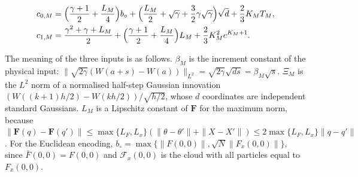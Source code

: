 \documentclass[11pt,a4paper]{report}
\begin{document}
\[\begin{aligned}c_{0,M}&=\Bigl(\frac{\gamma+1}{2}+\frac{L_M}{4}\Bigr)b_\circ+\Bigl(\frac{L_M}{2}+\sqrt\gamma+\frac32\gamma\sqrt\gamma\Bigr)\sqrt d+\frac23K_MT_M,\\ c_{1,M}&=\frac{\gamma^2+\gamma+L_M}{2}+\Bigl(\frac{\gamma+1}{2}+\frac{L_M}{4}\Bigr)L_M+\frac23K_M^2e^{K_M+1}.\end{aligned}\]


The meaning of the three inputs is as follows. \(\beta_M\) is the increment constant of the physical input: \(\|\sqrt{2\gamma}(W(a+s)-W(a))\|_{L^2}=\sqrt{2\gamma}\sqrt{ds}=\beta_M\sqrt s\). \(\Xi_M\) is the \(L^2\) norm of a normalised half-step Gaussian innovation \((W((k+1)h/2)-W(kh/2))/\sqrt{h/2}\), whose \(d\) coordinates are independent standard Gaussians. \(L_M\) is a Lipschitz constant of \(\mathbf F\) for the maximum norm, because \(\|\mathbf F(q)-\mathbf F(q')\|\le\max\{L_F,L_x\}(\|\theta-\theta'\|+\|X-X'\|)\le2\max\{L_F,L_x\}\|q-q'\|\). For the Euclidean encoding, \(b_\circ=\max\{\|F(0,0)\|,\sqrt N\|F_x(0,0)\|\}\), since \(\bar F(0,0)=F(0,0)\) and \(\mathcal F_x(0,0)\) is the cloud with all particles equal to \(F_x(0,0)\).
\end{document}

